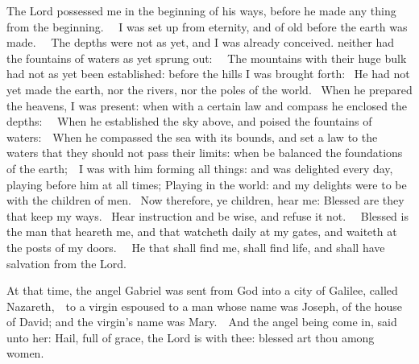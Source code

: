 



The Lord possessed me in the beginning of his ways, before he made any thing
from the beginning.   I was set up from eternity, and of old before the earth
was made.   The depths were not as yet, and I was already conceived. neither
had the fountains of waters as yet sprung out:   The mountains with their huge
bulk had not as yet been established: before the hills I was brought forth:  He
had not yet made the earth, nor the rivers, nor the poles of the world.  When
he prepared the heavens, I was present: when with a certain law and compass he
enclosed the depths:   When he established the sky above, and poised the
fountains of waters:  When he compassed the sea with its bounds, and set a law
to the waters that they should not pass their limits: when be balanced the
foundations of the earth;  I was with him forming all things: and was delighted
every day, playing before him at all times; Playing in the world: and my
delights were to be with the children of men.  Now therefore, ye children, hear
me: Blessed are they that keep my ways.  Hear instruction and be wise, and
refuse it not.   Blessed is the man that heareth me, and that watcheth daily at
my gates, and waiteth at the posts of my doors.   He that shall find me, shall
find life, and shall have salvation from the Lord.



At that time, the angel Gabriel was sent from God into a city of
Galilee, called Nazareth,  to a virgin espoused to a man whose name was Joseph,
of the house of David; and the virgin's name was Mary.  And the angel being
come in, said unto her: Hail, full of grace, the Lord is with thee: blessed art
thou among women. 



\bigskip





\bigskip





